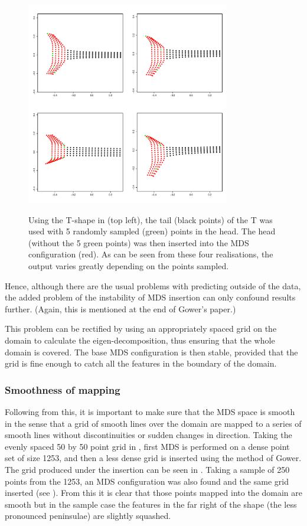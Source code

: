 \begin{figure}
\centering
\includegraphics[width=3.5in]{mds/figs/tshaperand.pdf} \\
\caption{Using the T-shape in  (top left), the tail (black points) of the T was used with 5 randomly sampled (green) points in the head. The head (without the 5 green points) was then inserted into the MDS configuration (red). As can be seen from these four realisations, the output varies greatly depending on the points sampled.}
\label{tshaperand}
\end{figure}

Hence, although there are the usual problems with predicting outside of the data, the added problem of the instability of MDS insertion can only confound results further. (Again, this is mentioned at the end of Gower's paper.)

This problem can be rectified by using an appropriately spaced grid on the domain to calculate the eigen-decomposition, thus ensuring that the whole domain is covered. The base MDS configuration is then stable, provided that the grid is fine enough to catch all the features in the boundary of the domain.

\subsubsection{Smoothness of mapping}

Following from this, it is important to make sure that the MDS space is smooth in the sense that a grid of smooth lines over the domain are mapped to a series of smooth lines without discontinuities or sudden changes in direction. Taking the evenly spaced 50 by 50 point grid in , first MDS is performed on a dense point set of size 1253, and then a less dense grid is inserted using the method of Gower. The grid produced under the insertion can be seen in . Taking a sample of 250 points from the 1253, an MDS configuration was also found and the same grid inserted (see ). From this it is clear that those points mapped into the domain are smooth but in the sample case the features in the far right of the shape (the less pronounced peninsulae) are slightly squashed.

